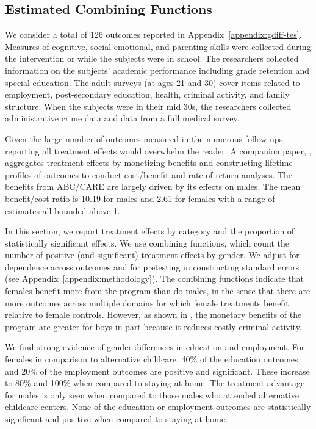 \subsection{Estimated Combining Functions}

We consider a total of 126 outcomes reported in Appendix~\ref{appendix:gdiff-tes}. Measures of cognitive, social-emotional, and parenting skills were collected during the intervention or while the subjects were in school. The researchers collected information on the subjects' academic performance including grade retention and special education. The adult surveys (at ages 21 and 30) cover items related to employment, post-secondary education, health, criminal activity, and family structure. When the subjects were in their mid 30s, the researchers collected administrative crime data and data from a full medical survey.

Given the large number of outcomes measured in the numerous follow-ups, reporting all treatment effects would overwhelm the reader. A companion paper, \citet{Garcia_Heckman_Leaf_etal_2017_Comp_CBA_Unpublished}, aggregates treatment effects by monetizing benefits and constructing lifetime profiles of outcomes to conduct cost/benefit and rate of return analyses. The benefits from ABC/CARE are largely driven by its effects on males. The mean benefit/cost ratio is 10.19 for males and 2.61 for females with a range of estimates all bounded above 1.

In this section, we report treatment effects by category and the proportion of statistically significant effects. We use combining functions, which count the number of positive (and significant) treatment effects by gender. We adjust for dependence across outcomes and for pretesting in constructing standard errors (see Appendix~\ref{appendix:methodology}). The combining functions indicate that females benefit more from the program than do males, in the sense that there are more outcomes across multiple domains for which female treatments benefit relative to female controls. However, as shown in \cite{Garcia_Heckman_Leaf_etal_2017_Comp_CBA_Unpublished}, the monetary benefits of the program are greater for boys in part because it reduces costly criminal activity.

We find strong evidence of gender differences in education and employment. For females in comparison to alternative childcare, 40\% of the education outcomes and 20\% of the employment outcomes are positive and significant. These increase to 80\% and 100\% when compared to staying at home. The treatment advantage for males is only seen when compared to those males who attended alternative childcare centers. None of the education or employment outcomes are statistically significant and positive when compared to staying at home.

